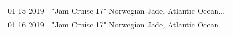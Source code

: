 \begin{supertabular}{ll}
 01-15-2019 &  "Jam Cruise 17" Norwegian Jade, Atlantic Ocean... \\
 01-16-2019 &  "Jam Cruise 17" Norwegian Jade, Atlantic Ocean... \\
\end{supertabular}
